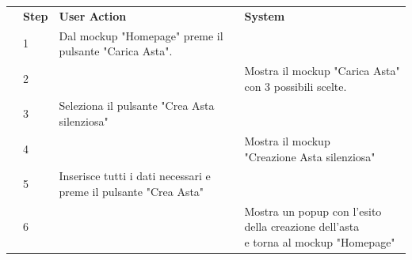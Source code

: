 \begin{table}[H]
\begin{tabularx}{\linewidth}{|p{120pt}|p{40pt}|X|X|}
		\hline \rowcolor[HTML]{DCDCDC}
		\multirow{1}{*}{}{\textbf{\sffamily Description}}  & \textbf{\sffamily Step}                                                                                                & \textbf{\sffamily User Action}                                   & \textbf{\sffamily System}                              \\
		\cline{2-4}                                        & 1                                                                                                                      & Dal mockup "Homepage" preme il pulsante "Carica Asta".           &                                                        \\
		\cline{2-4}                                        & 2                                                                                                                      &                                                                  & Mostra il mockup "Carica Asta" con 3 possibili scelte. \\
		\cline{2-4}                                        & 3                                                                                                                      & Seleziona il pulsante "Crea Asta silenziosa"                     &                                                        \\
		\cline{2-4}                                        & 4                                                                                                                      &                                                                  & \makecell{Mostra il mockup                             \\ "Creazione Asta silenziosa" }          \\
		\cline{2-4}                                        & 5                                                                                                                      & Inserisce tutti i dati necessari e preme il pulsante "Crea Asta" &                                                        \\
		\cline{2-4}                                        & 6                                                                                                                      &                                                                  & \makecell{Mostra un popup con l'esito                  \\ della creazione dell'asta \\ e torna al mockup "Homepage"} \\


\end{tabularx}
\end{table}
